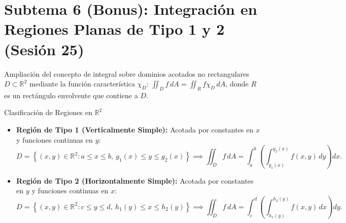 \documentclass[11pt,a4paper]{article}
\begin{document}
\section{Subtema 6 (Bonus): Integración en Regiones Planas de Tipo 1 y 2 (Sesión 25)}

Ampliación del concepto de integral sobre dominios acotados no rectangulares $D \subset \mathbb{R}^2$ mediante la función característica $\chi_D$: $\iint_D f \, dA = \iint_R f \chi_D \, dA$, donde $R$ es un rectángulo envolvente que contiene a $D$.

\begin{theorempage}{Clasificación de Regiones en $\mathbb{R}^2$}
\begin{itemize}[noitemsep]
    \item \textbf{Región de Tipo 1 (Verticalmente Simple):} Acotada por constantes en $x$ y funciones continuas en $y$:
    \[
    D = \left\{ (x,y) \in \mathbb{R}^2 : a \le x \le b, \ g_1(x) \le y \le g_2(x) \right\} \implies \iint_D f \, dA = \int_a^b \left( \int_{g_1(x)}^{g_2(x)} f(x,y) \, dy \right) dx.
    \]
    \item \textbf{Región de Tipo 2 (Horizontalmente Simple):} Acotada por constantes en $y$ y funciones continuas en $x$:
    \[
    D = \left\{ (x,y) \in \mathbb{R}^2 : c \le y \le d, \ h_1(y) \le x \le h_2(y) \right\} \implies \iint_D f \, dA = \int_c^d \left( \int_{h_1(y)}^{h_2(y)} f(x,y) \, dx \right) dy.
    \]
\end{itemize}
\end{theorempage}
\end{document}
